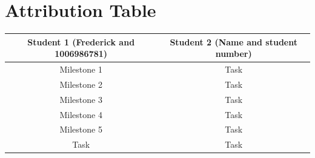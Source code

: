 \documentclass{article}
\begin{document}
\section{Attribution Table}

\begin{center}
\begin{tabular}{|| c | c ||}
\hline
 Student 1 (Frederick and 1006986781) &  Student 2 (Name and student number) \\ 
 \hline
 Milestone 1 & Task\\
 \hline
 Milestone 2 & Task\\
 \hline
 Milestone 3 & Task\\ 
 \hline
 Milestone 4 & Task\\ 
 \hline
 Milestone 5 & Task\\
 \hline
 Task & Task\\  
 \hline
\end{tabular}
\end{center}

\end{document}
